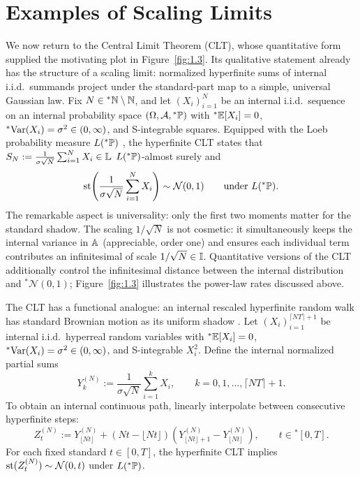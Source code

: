\section{Examples of Scaling Limits}

We now return to the Central Limit Theorem (CLT), whose quantitative form supplied the motivating plot in Figure~\ref{fig:1.3}. Its qualitative statement already has the structure of a scaling limit: normalized hyperfinite sums of internal i.i.d.\ summands project under the standard-part map to a simple, universal Gaussian law. Fix $N \in {}^*\mathbb{N} \setminus \mathbb{N}$, and let $(X_i)_{i=1}^N$ be an internal i.i.d.\ sequence on an internal probability space $(\Omega, \mathcal{A}, {}^*\mathbb{P})$ with ${}^*\mathbb{E}[X_i] = 0$, ${}^*\!\operatorname{Var}(X_i) = \sigma^2 \in (0,\infty)$, and S-integrable squares. Equipped with the Loeb probability measure $L({}^*\mathbb{P})$ \cite{loeb1975conversion,cutland2000loeb}, the hyperfinite CLT states that $S_N := \frac{1}{\sigma\sqrt{N}}\sum_{i=1}^N X_i \in \mathbb{L}$ $L({}^*\mathbb{P})$-almost surely and
\begin{equation}\label{eq:1.2}
\operatorname{st}\!\left(\frac{1}{\sigma\sqrt{N}}\sum_{i=1}^N X_i\right) \sim \mathcal{N}(0, 1) \qquad \text{under } L({}^*\mathbb{P}).
\end{equation}
The remarkable aspect is universality: only the first two moments matter for the standard shadow. The scaling $1/\sqrt{N}$ is not cosmetic: it simultaneously keeps the internal variance in $\mathbb{A}$ (appreciable, order one) and ensures each individual term contributes an infinitesimal of scale $1/\sqrt{N} \in \mathbb{I}$. Quantitative versions of the CLT additionally control the infinitesimal distance between the internal distribution and ${}^*\mathcal{N}(0,1)$; Figure~\ref{fig:1.3} illustrates the power-law rates discussed above.

The CLT has a functional analogue: an internal rescaled hyperfinite random walk has standard Brownian motion as its uniform shadow \cite{anderson1976nonstandard}. Let $(X_i)_{i=1}^{\lceil NT\rceil + 1}$ be internal i.i.d.\ hyperreal random variables with ${}^*\mathbb{E}[X_i] = 0$, ${}^*\!\operatorname{Var}(X_i) = \sigma^2 \in (0,\infty)$, and S-integrable $X_i^2$. Define the internal normalized partial sums
\begin{equation}\label{eq:1.3}
Y_k^{(N)} := \frac{1}{\sigma\sqrt{N}}\sum_{i=1}^k X_i, \qquad k = 0, 1, \dots, \lceil NT\rceil + 1.
\end{equation}
To obtain an internal continuous path, linearly interpolate between consecutive hyperfinite steps:
\begin{equation}\label{eq:1.4}
Z_t^{(N)} := Y_{\lfloor Nt\rfloor}^{(N)} + (Nt - \lfloor Nt\rfloor)\!\left(Y_{\lfloor Nt\rfloor+1}^{(N)} - Y_{\lfloor Nt\rfloor}^{(N)}\right), \qquad t \in {}^*[0, T].
\end{equation}
For each fixed standard $t \in [0,T]$, the hyperfinite CLT implies $\operatorname{st}(Z_t^{(N)}) \sim \mathcal{N}(0, t)$ under $L({}^*\mathbb{P})$.

